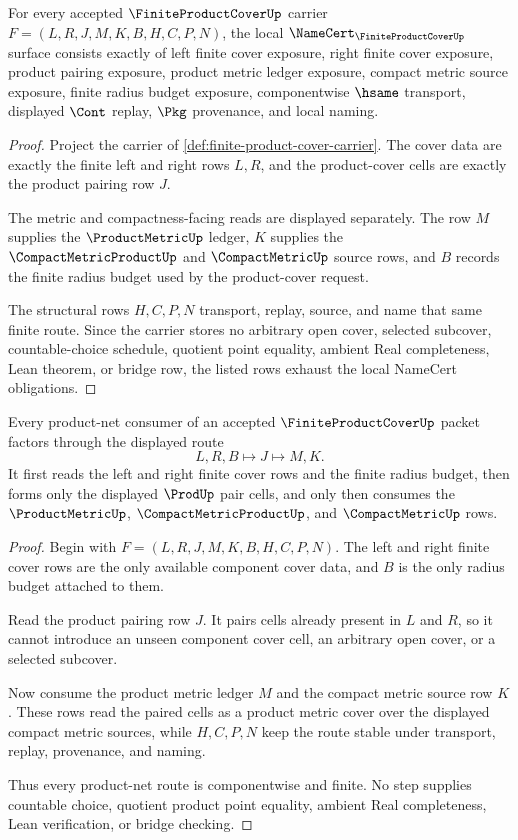\begin{theorem}
\label{thm:finite-product-cover-namecert-obligations}
For every accepted $\FiniteProductCoverUp$ carrier $F=(L,R,J,M,K,B,H,C,P,N)$, the local $\NameCert_{\FiniteProductCoverUp}$ surface consists exactly of left finite cover exposure, right finite cover exposure, product pairing exposure, product metric ledger exposure, compact metric source exposure, finite radius budget exposure, componentwise $\hsame$ transport, displayed $\Cont$ replay, $\Pkg$ provenance, and local naming.
\end{theorem}
\begin{proof}
Project the carrier of \autoref{def:finite-product-cover-carrier}. The cover data are exactly the finite left and right rows $L,R$, and the product-cover cells are exactly the product pairing row $J$.

The metric and compactness-facing reads are displayed separately. The row $M$ supplies the $\ProductMetricUp$ ledger, $K$ supplies the $\CompactMetricProductUp$ and $\CompactMetricUp$ source rows, and $B$ records the finite radius budget used by the product-cover request.

The structural rows $H,C,P,N$ transport, replay, source, and name that same finite route. Since the carrier stores no arbitrary open cover, selected subcover, countable-choice schedule, quotient point equality, ambient Real completeness, Lean theorem, or bridge row, the listed rows exhaust the local NameCert obligations.
\end{proof}

\begin{theorem}
\label{thm:finite-product-cover-product-net-route}
Every product-net consumer of an accepted $\FiniteProductCoverUp$ packet factors through the displayed route
$$
L,R,B \longmapsto J \longmapsto M,K .
$$
It first reads the left and right finite cover rows and the finite radius budget, then forms only the displayed $\ProdUp$ pair cells, and only then consumes the $\ProductMetricUp$, $\CompactMetricProductUp$, and $\CompactMetricUp$ rows.
\end{theorem}
\begin{proof}
Begin with $F=(L,R,J,M,K,B,H,C,P,N)$. The left and right finite cover rows are the only available component cover data, and $B$ is the only radius budget attached to them.

Read the product pairing row $J$. It pairs cells already present in $L$ and $R$, so it cannot introduce an unseen component cover cell, an arbitrary open cover, or a selected subcover.

Now consume the product metric ledger $M$ and the compact metric source row $K$. These rows read the paired cells as a product metric cover over the displayed compact metric sources, while $H,C,P,N$ keep the route stable under transport, replay, provenance, and naming.

Thus every product-net route is componentwise and finite. No step supplies countable choice, quotient product point equality, ambient Real completeness, Lean verification, or bridge checking.
\end{proof}

